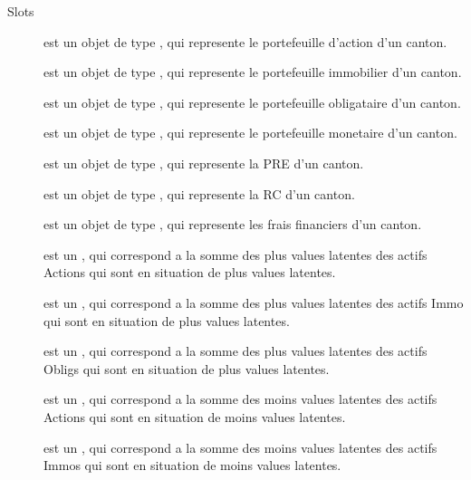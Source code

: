 \documentclass[a4paper]{book}
\begin{document}
\begin{Section}{Slots}

\begin{description}

\item[] est un objet de type , qui represente le portefeuille d'action d'un canton.

\item[] est un objet de type , qui represente le portefeuille immobilier d'un canton.

\item[] est un objet de type , qui represente le portefeuille obligataire d'un canton.

\item[] est un objet de type , qui represente le portefeuille monetaire d'un canton.

\item[] est un objet de type , qui represente la PRE d'un canton.

\item[] est un objet de type , qui represente la RC d'un canton.

\item[] est un objet de type , qui represente les frais financiers d'un canton.

\item[] est un , qui correspond a la somme des plus values latentes des actifs Actions qui sont en situation de plus values latentes.

\item[] est un , qui correspond a la somme des plus values latentes des actifs Immo qui sont en situation de plus values latentes.

\item[] est un , qui correspond a la somme des plus values latentes des actifs Obligs qui sont en situation de plus values latentes.

\item[] est un , qui correspond a la somme des moins values latentes des actifs Actions qui sont en situation de moins values latentes.

\item[] est un , qui correspond a la somme des moins values latentes des actifs Immos qui sont en situation de moins values latentes.


\end{description}
\end{Section}
\end{document}
